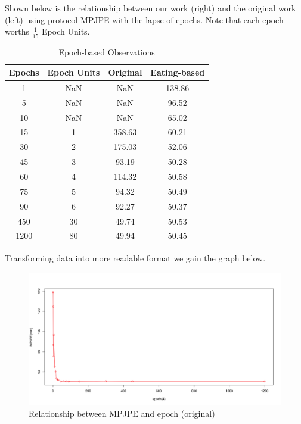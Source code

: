 \documentclass[10pt,twocolumn,letterpaper]{article}
\begin{document}
Shown below is the relationship between our work (right) and the original work (left) using protocol MPJPE with the
lapse of epochs.
Note that each epoch worths $\frac{1}{15}$ Epoch Units.

\begin{table}[H]
\caption{Epoch-based Observations}
\centering
\begin{tabular}{cccc}
\hline
Epochs & Epoch Units & Original & Eating-based\\
\hline

1& NaN & NaN & 138.86 \\
5& NaN & NaN & 96.52  \\
10& NaN & NaN & 65.02  \\
15& 1 & 358.63 & 60.21 \\
30& 2 & 175.03 & 52.06 \\
45& 3 & 93.19 & 50.28  \\
60& 4 & 114.32 & 50.58  \\
75& 5 & 94.32 & 50.49  \\
90& 6 & 92.27 & 50.37 \\
450& 30 & 49.74 & 50.53 \\
1200& 80 & 49.94 & 50.45 \\


\hline
\end{tabular}
\end{table}

Transforming data into more readable format we gain the graph below.

\begin{figure}[H]
	\begin{center}
  		\includegraphics[width=0.9\linewidth]{MPJPE_epoch_overall.png}
	\end{center}
   	\caption{Relationship between MPJPE and epoch (original)}
	\label{fig:long}
	\label{fig:onecol}
\end{figure}
\end{document}
